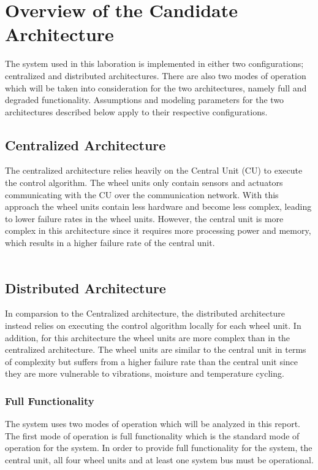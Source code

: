 
\newpage
\section{Overview of the Candidate Architecture}
The system used in this laboration is implemented in either two configurations; centralized and distributed architectures. There are also two modes of operation which will be taken into consideration for the two architectures, namely full and degraded functionality. Assumptions and modeling parameters for the two architectures described below apply to their respective configurations. 

\subsection{Centralized Architecture}
The centralized architecture relies heavily on the Central Unit (CU) to execute the control algorithm. The wheel units only contain sensors and actuators communicating with the CU over the communication network. With this approach the wheel units contain less hardware and become less complex, leading to lower failure rates in the wheel units. However, the central unit is more complex in this architecture since it requires more processing power and memory, which results in a higher failure rate of the central unit.\\
\\
\subsection{Distributed Architecture}
In comparsion to the Centralized architecture, the distributed architecture instead relies on executing the control algorithm locally for each wheel unit. In addition, for this architecture the wheel units are more complex than in the centralized architecture. The wheel units are similar to the central unit in terms of complexity but suffers from a higher failure rate than the central unit since they are more vulnerable to vibrations, moisture and temperature cycling. 
\subsubsection{Full Functionality}
The system uses two modes of operation which will be analyzed in this report.
The first mode of operation is full functionality which is the standard mode of operation for the system. In order to provide full functionality for the system, the central unit, all four wheel units and at least one system bus must be operational.

